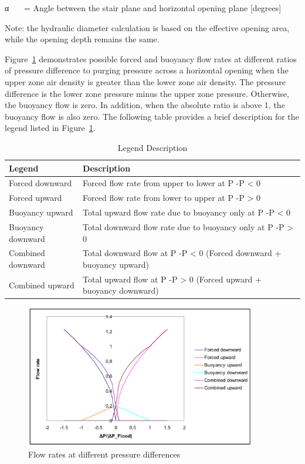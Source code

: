 α~~~ = Angle between the stair plane and horizontal opening plane {[}degrees{]}

Note: the hydraulic diameter calculation is based on the effective opening area, while the opening depth remains the same.

Figure~\ref{fig:flow-rates-at-different-pressure-differences} demonstrates possible forced and buoyancy flow rates at different ratios of pressure difference to purging pressure across a horizontal opening when the upper zone air density is greater than the lower zone air density. The pressure difference is the lower zone pressure minus the upper zone pressure. Otherwise, the buoyancy flow is zero. In addition, when the absolute ratio is above 1, the buoyancy flow is also zero. The following table provides a brief description for the legend listed in Figure~\ref{fig:flow-rates-at-different-pressure-differences}.

\begin{longtable}[c]{p{1.5in}p{4.5in}}
\caption{  Legend Description \protect \label{table:legend-description}}\\
\toprule 
Legend & Description \tabularnewline \midrule
\endhead
Forced downward & Forced flow rate from upper to lower at P  -P    <  0 \tabularnewline
Forced upward & Forced flow rate from lower to upper at P  -P    >  0 \tabularnewline
Buoyancy upward & Total upward flow rate due to buoyancy only at P  -P    <  0 \tabularnewline
Buoyancy downward & Total downward flow rate due to buoyancy only at P  -P    >  0 \tabularnewline
Combined downward & Total downward flow at P  -P    <  0 (Forced downward + buoyancy upward) \tabularnewline
Combined upward & Total upward flow at P  -P    >  0 (Forced upward + buoyancy downward) \tabularnewline
\bottomrule
\end{longtable}

\begin{figure}[hbtp] %
\centering
\includegraphics[width=0.9\textwidth, height=0.9\textheight, keepaspectratio=true]{media/image2743.svg.png}
\caption{Flow rates at different pressure differences \protect \label{fig:flow-rates-at-different-pressure-differences}}
\end{figure}

